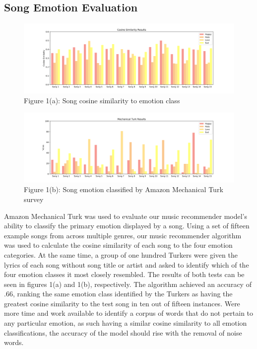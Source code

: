 \documentclass[10pt,twocolumn]{article}
\begin{document}
\subsection{Song Emotion Evaluation}
\begin{figure}[!htb]
\centering
\includegraphics[width=\textwidth]{test_cos.png}
\caption{Figure 1(a): Song cosine similarity to emotion class}
\label{fig:digraph}
\end{figure}
\begin{figure}[!htb]
\centering
\includegraphics[width=\textwidth]{test_vote.png}
\caption{Figure 1(b): Song emotion classified by Amazon Mechanical Turk survey}
\label{fig:digraph}
\end{figure}
Amazon Mechanical Turk was used to evaluate our music recommender model's ability to classify the primary emotion displayed by a song. Using a set of fifteen example songs from across multiple genres, our music recommender algorithm was used to calculate the cosine similarity of each song to the four emotion categories. At the same time, a group of one hundred Turkers were given the lyrics of each song without song title or artist and asked to identify which of the four emotion classes it most closely resembled. The results of both tests can be seen in figures 1(a) and 1(b), respectively. The algorithm achieved an accuracy of .66, ranking the same emotion class identified by the Turkers as having the greatest cosine similarity to the test song in ten out of fifteen instances. Were more time and work available to identify a corpus of words that do not pertain to any particular emotion, as such having a similar cosine similarity to all emotion classifications, the accuracy of the model should rise with the removal of noise words.
\end{document}
